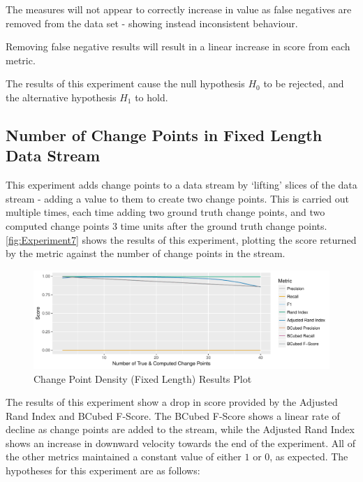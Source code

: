 \documentclass[../main.tex]{subfiles}
\begin{document}
\begin{hypothesis*}
    The measures will not appear to correctly increase in value as false negatives are removed from the data set - showing instead inconsistent behaviour.
\end{hypothesis*}

\begin{nullhypothesis*}
    Removing false negative results will result in a linear increase in score from each metric.
\end{nullhypothesis*}

The results of this experiment cause the null hypothesis $H_0$ to be rejected, and the alternative hypothesis $H_1$ to hold.

\subsection{Number of Change Points in Fixed Length Data Stream}

This experiment adds change points to a data stream by `lifting' slices of the data stream - adding a value to them to create two change points. This is carried out multiple times, each time adding two ground truth change points, and two computed change points 3 time units after the ground truth change points. \autoref{fig:Experiment7} shows the results of this experiment, plotting the score returned by the metric against the number of change points in the stream.

\begin{figure}[h]
    \includegraphics[width=\textwidth]{figures/Experiment8}
    \caption{Change Point Density (Fixed Length) Results Plot}
    \label{fig:Experiment7}
\end{figure}

The results of this experiment show a drop in score provided by the Adjusted Rand Index and BCubed F-Score. The BCubed F-Score shows a linear rate of decline as change points are added to the stream, while the Adjusted Rand Index shows an increase in downward velocity towards the end of the experiment. All of the other metrics maintained a constant value of either $1$ or $0$, as expected. The hypotheses for this experiment are as follows:
\end{document}
